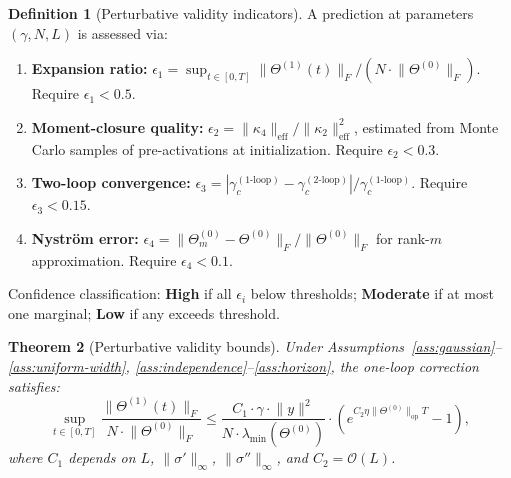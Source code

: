 \documentclass[11pt]{article}
\newtheorem{theorem}{Theorem}[section]
\theoremstyle{definition}
\newtheorem{definition}[theorem]{Definition}
\newcommand{\cO}{\mathcal{O}}
\newcommand{\norm}[1]{\lVert #1 \rVert}
\renewcommand{\Theta}{\varTheta}
\begin{document}
\begin{definition}[Perturbative validity indicators]
\label{def:validity}
A prediction at parameters $(\gamma, N, L)$ is assessed via:
\begin{enumerate}[label=(\arabic*)]
\item \textbf{Expansion ratio:} $\epsilon_1 = \sup_{t \in [0,T]} \norm{\Theta^{(1)}(t)}_F / (N \cdot \norm{\Theta^{(0)}}_F)$. Require $\epsilon_1 < 0.5$.
\item \textbf{Moment-closure quality:} $\epsilon_2 = \norm{\kappa_4}_{\mathrm{eff}} / \norm{\kappa_2}_{\mathrm{eff}}^2$, estimated from Monte Carlo samples of pre-activations at initialization. Require $\epsilon_2 < 0.3$.
\item \textbf{Two-loop convergence:} $\epsilon_3 = |\gamma_c^{(1\text{-loop})} - \gamma_c^{(2\text{-loop})}| / \gamma_c^{(1\text{-loop})}$. Require $\epsilon_3 < 0.15$.
\item \textbf{Nystr\"om error:} $\epsilon_4 = \norm{\Theta^{(0)}_m - \Theta^{(0)}}_F / \norm{\Theta^{(0)}}_F$ for rank-$m$ approximation. Require $\epsilon_4 < 0.1$.
\end{enumerate}
Confidence classification: \textbf{High} if all $\epsilon_i$ below thresholds; \textbf{Moderate} if at most one marginal; \textbf{Low} if any exceeds threshold.
\end{definition}

\begin{theorem}[Perturbative validity bounds]
\label{thm:validity}
Under Assumptions~\ref{ass:gaussian}--\ref{ass:uniform-width}, \ref{ass:independence}--\ref{ass:horizon}, the one-loop correction satisfies:
\begin{equation}
\label{eq:validity-bound}
\sup_{t \in [0,T]} \frac{\norm{\Theta^{(1)}(t)}_F}{N \cdot \norm{\Theta^{(0)}}_F} \le \frac{C_1 \cdot \gamma \cdot \norm{y}^2}{N \cdot \lambda_{\min}(\Theta^{(0)})} \cdot \left(e^{C_2 \eta \norm{\Theta^{(0)}}_{\mathrm{op}} T} - 1\right),
\end{equation}
where $C_1$ depends on $L$, $\norm{\sigma'}_\infty$, $\norm{\sigma''}_\infty$, and $C_2 = \cO(L)$.
\end{theorem}
\end{document}
